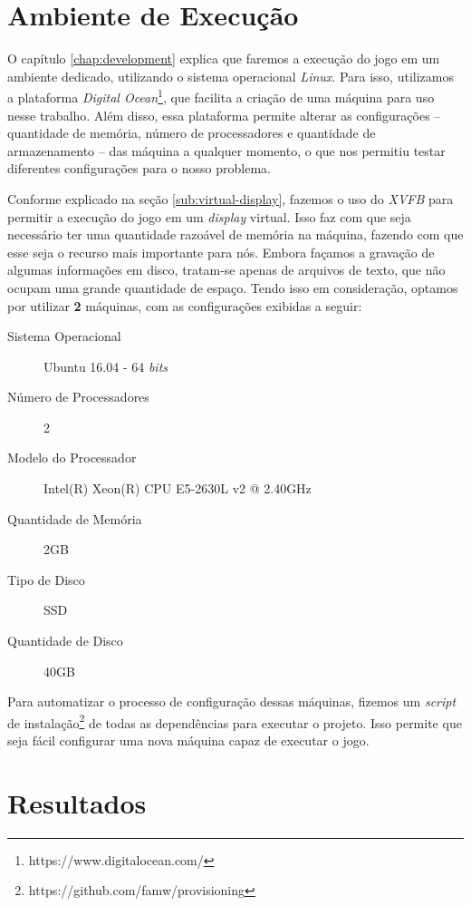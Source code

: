 \section{\label{section:environment}Ambiente de Execução}

O capítulo \ref{chap:development} explica que faremos a execução do jogo em um
ambiente dedicado, utilizando o sistema operacional \textit{Linux}. Para isso,
utilizamos a plataforma \textit{Digital
Ocean}\footnote{https://www.digitalocean.com/}, que facilita a criação de uma
máquina para uso nesse trabalho. Além disso, essa plataforma permite alterar as
configurações -- quantidade de memória, número de processadores e quantidade de
armazenamento -- das máquina a qualquer momento, o que nos permitiu testar
diferentes configurações para o nosso problema.

Conforme explicado na seção \ref{sub:virtual-display}, fazemos o uso do
\textit{XVFB} para permitir a execução do jogo em um \textit{display} virtual.
Isso faz com que seja necessário ter uma quantidade razoável de memória na
máquina, fazendo com que esse seja o recurso mais importante para nós. Embora
façamos a gravação de algumas informações em disco, tratam-se apenas de
arquivos de texto, que não ocupam uma grande quantidade de espaço. Tendo isso
em consideração, optamos por utilizar \textbf{2} máquinas, com as configurações
exibidas a seguir:

\begin{description}
    \item [Sistema Operacional] Ubuntu 16.04 - 64 \textit{bits}
    \item [Número de Processadores] 2
    \item [Modelo do Processador] Intel(R) Xeon(R) CPU E5-2630L v2 @ 2.40GHz
    \item [Quantidade de Memória] 2GB
    \item [Tipo de Disco] SSD
    \item [Quantidade de Disco] 40GB
\end{description}

Para automatizar o processo de configuração dessas máquinas, fizemos um
\textit{script} de instalação\footnote{https://github.com/famw/provisioning} de
todas as dependências para executar o projeto. Isso permite que seja fácil
configurar uma nova máquina capaz de executar o jogo.

\section{\label{section:results}Resultados}


